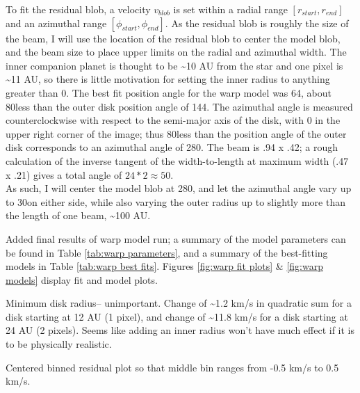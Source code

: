 \documentclass[a4paper]{tufte-handout}
\begin{document}
To fit the residual blob, a velocity $v_{blob}$ is set within a radial range $[r_{start}, r_{end}]$ and an azimuthal range $[\phi_{start}, \phi_{end}]$. As the residual blob is roughly the size of the beam, I will use the location of the residual blob to center the model blob, and the beam size to place upper limits on the radial and azimuthal width. The inner companion planet is thought to be \textasciitilde10 AU from the star and one pixel is \textasciitilde11 AU, so there is little motivation for setting the inner radius to anything greater than 0. The best fit position angle for the warp model was 64\textdegree, about 80\textdegree  less than the outer disk position angle of 144\textdegree. The azimuthal angle is measured counterclockwise with respect to the semi-major axis of the disk, with 0 \textdegree  in the upper right corner of the image; thus 80\textdegree  less than the position angle of the outer disk corresponds to an azimuthal angle of 280\textdegree. The beam is .94 x .42; a rough calculation of the inverse tangent of the  width-to-length at maximum width (.47 x .21) gives a total angle of $24*2 \approx 50$\textdegree. \\
As such, I will center the model blob at 280\textdegree, and let the azimuthal angle vary up to 30\textdegree on either side, while also varying the outer radius up to slightly more than the length of one beam, \textasciitilde 100 AU.\\

\hrulefill

Added final results of warp model run; a summary of the model parameters can be found in Table \ref{tab:warp parameters}, and a summary of the best-fitting models in Table \ref{tab:warp best fits}. Figures \ref{fig:warp fit plots} \& \ref{fig:warp models} display fit and model plots.


\hrulefill


Minimum disk radius-- unimportant. Change of \textasciitilde1.2 km/s in quadratic sum for a disk starting at 12 AU (1 pixel), and change of \textasciitilde11.8 km/s for a disk starting at 24 AU (2 pixels). Seems like adding an inner radius won't have much effect if it is to be physically realistic.

\noindent Centered binned residual plot so that middle bin ranges from -0.5 km/s to 0.5 km/s.
\end{document}
